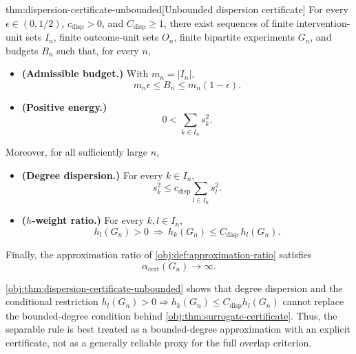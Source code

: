 \begin{theoremv}{thm:dispersion-certificate-unbounded}[Unbounded dispersion certificate]
For every $\epsilon\in(0,1/2)$, $c_{\mathrm{disp}}>0$, and $C_{\mathrm{disp}}\geq 1$, there exist sequences of finite intervention-unit sets $I_n$, finite outcome-unit sets $O_n$, finite bipartite experiments $G_n$, and budgets $B_n$ such that, for every $n$,

\begin{itemize}

\item \textbf{(Admissible budget.)} With $m_n=|I_n|$,
\[
m_n\epsilon\leq B_n\leq m_n(1-\epsilon).
\]

\item \textbf{(Positive energy.)}
\[
0<\sum_{k\in I_n}s_k^2.
\]

\end{itemize}

Moreover, for all sufficiently large $n$,

\begin{itemize}

\item \textbf{(Degree dispersion.)} For every $k\in I_n$,
\[
s_k^2\leq c_{\mathrm{disp}}\sum_{l\in I_n}s_l^2.
\]

\item \textbf{($h$-weight ratio.)} For every $k,l\in I_n$,
\[
h_l(G_n)>0\ \Longrightarrow\ h_k(G_n)\leq C_{\mathrm{disp}}\,h_l(G_n).
\]

\end{itemize}

Finally, the approximation ratio of \cref{obj:def:approximation-ratio} satisfies
\[
\alpha_{\mathrm{cert}}(G_n)\longrightarrow\infty .
\]
\end{theoremv}

\cref{obj:thm:dispersion-certificate-unbounded} shows that degree dispersion and the conditional restriction \(h_l(G_n)>0\Longrightarrow h_k(G_n)\le C_{\mathrm{disp}}h_l(G_n)\) cannot replace the bounded-degree condition behind \cref{obj:thm:surrogate-certificate}. Thus, the separable rule is best treated as a bounded-degree approximation with an explicit certificate, not as a generally reliable proxy for the full overlap criterion.
